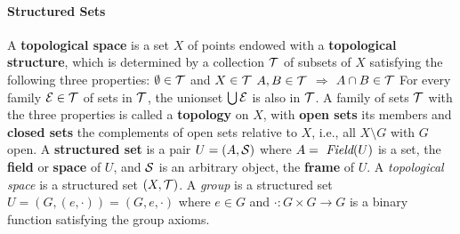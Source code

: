 \documentclass{myproc}
\begin{document}
\paragraph{Structured Sets}
\bit
\w A {\bf{}topological space} is a set $X$ of points endowed with a
	{\bf{}topological structure}, which is determined by a collection
	$\cal{}T$ of subsets of $X$ satisfying the following three
	properties:
	\bit
	\w [(a)] $\emptyset \in \cal{}T$ and $X \in \cal{}T$
	\w [(b)] $A, B \in \cal{}T$ $\Rightarrow$ $A \cap B \in \cal{}T$
	\w [(c)] For every family $\cal{}E \in T$ of sets in
		$\cal{}T$, the unionset $\bigcup\cal{}E$ is also in $\cal{}T$.
	\eit
\w A family of sets $\cal{}T$ with the three properties is called a
	{\bf{}topology} on $X$, with {\bf{}open sets} its members and
	{\bf{}closed sets} the complements of open sets relative to $X$, 
	i.e., all $X \setminus G$ with $G$ open.
\w A {\bf{}structured set} is a pair $U = (A, \cal{}S)$
	where $A = \mbox{\ \em{}Field}(U)$ is a set, the {\bf{}field} or {\bf{}space} of $U$, 
	and $\cal{}S$ is an arbitrary object, the {\bf{}frame} of $U$.
		\bit
		\w A {\em{}topological space\/} is a structured set $(X, \cal{}T)$.
		\w A {\em{}group\/} is a structured set $U = (G, (e, \cdot)) 
			= (G, e, \cdot)$ where
			$e \in G$ and $\cdot:G\times{G} \rightarrow G$ is a binary function
			satisfying the group axioms. 
		\eit

\eit
\end{document}
